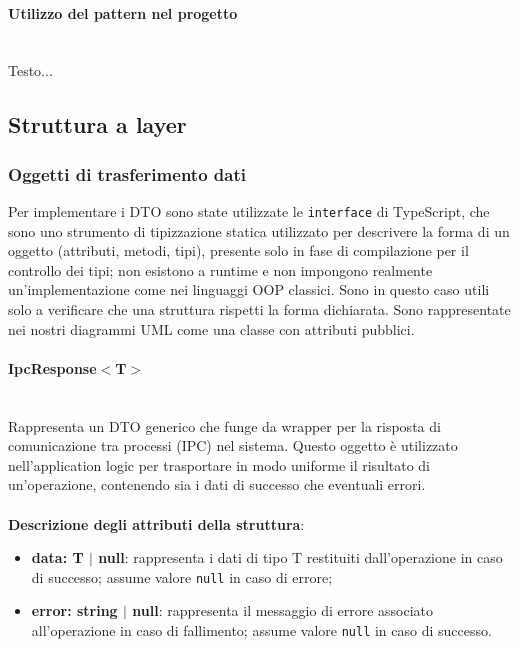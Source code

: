 \documentclass[a4paper,12pt]{article}
\begin{document}
{{{                \paragraph{ Utilizzo del pattern nel progetto}\mbox{}\\
                Testo...
            }
        }
        \subsection{Struttura a layer} {
            \subsubsection{Oggetti di trasferimento dati} {
                Per implementare i DTO sono state utilizzate le \verb|interface| di TypeScript, che sono uno strumento di tipizzazione statica utilizzato per descrivere la forma di un oggetto (attributi, metodi, tipi), presente solo in fase di compilazione per il controllo dei tipi; non esistono a runtime e non impongono realmente un'implementazione come nei linguaggi OOP classici. Sono in questo caso utili solo a verificare che una struttura rispetti la forma dichiarata. Sono rappresentate nei nostri diagrammi UML come una classe con attributi pubblici.  
                \paragraph{IpcResponse$<$T$>$}\label{par:ipcResponse}\mbox{}\\
                Rappresenta un DTO generico che funge da wrapper per la risposta di comunicazione tra processi (IPC) nel sistema. Questo oggetto è utilizzato nell'application logic per trasportare in modo uniforme il risultato di un'operazione, contenendo sia i dati di successo che eventuali errori.\\
                \\
                \textbf{Descrizione degli attributi della struttura}:
                \begin{itemize}
                    \item \textbf{data: T $|$ null}: rappresenta i dati di tipo T restituiti dall'operazione in caso di successo; assume valore \texttt{null} in caso di errore;
                    \item \textbf{error: string $|$ null}: rappresenta il messaggio di errore associato all'operazione in caso di fallimento; assume valore \texttt{null} in caso di successo.
                \end{itemize}
                
}}}
\end{document}
